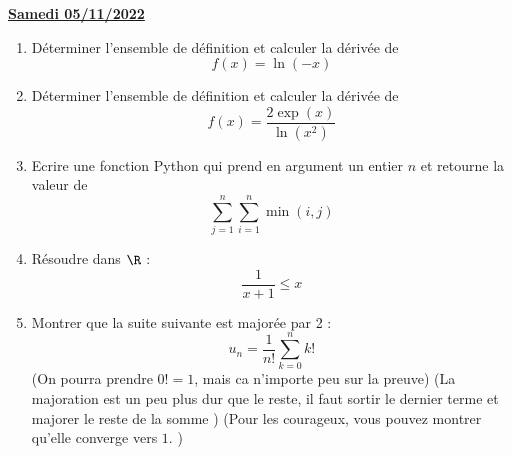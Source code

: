 \documentclass[a4paper, 11pt,reqno]{article}
\newcommand{\jour}[1]{
\begin{center}
\underline{\textbf{#1}}
\end{center}

 }
\begin{document}
\jour{Samedi 05/11/2022}
\begin{exercice}
\begin{enumerate}
\item  Déterminer l'ensemble de définition et calculer la dérivée de
$$f(x)=\ln(-x)$$
\item  Déterminer l'ensemble de définition et calculer la dérivée de
$$f(x)= \frac{2\exp(x)}{\ln(x^2)}$$

\item Ecrire une fonction Python qui prend en argument un entier $n$ et retourne la valeur de 
$$\sum_{j=1}^n\sum_{i=1}^n \min(i,j)$$
\item Résoudre dans $\R$ : 
$$\frac{1}{x+1}\leq x$$
\item Montrer que la suite suivante est majorée par 2 : 
$$u_n = \frac{1}{n!} \sum_{k=0}^n k!$$
(On pourra prendre $0! =1$, mais ca n'importe peu sur la preuve) 
(La majoration est un peu plus dur que le reste, il faut sortir le dernier terme et majorer le reste de la  somme ) 
(Pour les courageux, vous pouvez montrer qu'elle converge vers $1$. )
\end{enumerate}
\end{exercice}
\end{document}
